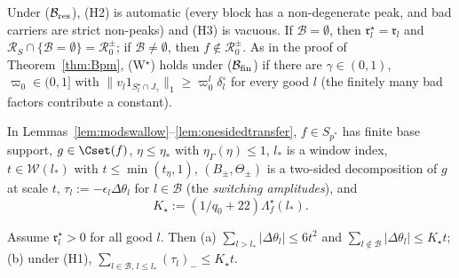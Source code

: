 Under ($\mathcal B_{\rm res}$), (H2) is automatic (every block has a
non-degenerate peak, and bad carriers are strict non-peaks) and (H3) is
vacuous.  If $\mathcal B=\emptyset$, then $\mathfrak r^\star_l=\mathfrak r_l$
and $\mathcal R_S\cap\{\mathcal B=\emptyset\}=\mathcal R_0^\pm$; if
$\mathcal B\ne\emptyset$, then $f\notin\mathcal R_0^\pm$.  As in the proof
of Theorem~\ref{thm:Bpm}, (W$^\star$) holds under ($\mathcal B_{\rm fin}$)
if there are $\gamma\in(0,1)$, $\varpi_0\in(0,1]$ with $\|v_l
1_{S^\star_l\cap J_\gamma}\|_1\ge\varpi_0^l\delta^\circ_l$ for every good
$l$ (the finitely many bad factors contribute a constant).

In Lemmas~\ref{lem:modswallow}--\ref{lem:onesidedtransfer}, $f\in S_{p^*}$
has finite base support, $g\in\Cset(f)$, $\eta\le\eta_*$ with
$\eta_\Gamma(\eta)\le1$, $l_*$ is a window index, $t\in\mathcal W(l_*)$ with
$t\le\min(t_\eta,1)$, $(B_\pm,\Theta_\pm)$ is a two-sided decomposition of
$g$ at scale $t$, $\tau_l:=-\epsilon_l\Delta\theta_l$ for $l\in\mathcal B$
(the \emph{switching amplitudes}), and
\[
 K_\star:=(1/q_0+22)\Lambda^\star_f(l_*).
\]

\begin{lemma}\label{lem:modswallow}
Assume $\mathfrak r^\star_l>0$ for all good $l$.  Then
\textup{(a)} $\sum_{l>l_*}|\Delta\theta_l|\le6t^2$ and
$\sum_{l\notin\mathcal B}|\Delta\theta_l|\le K_\star t$;
\textup{(b)} under \textup{(H1)},
$\sum_{l\in\mathcal B,\,l\le l_*}(\tau_l)_-\le K_\star t$.
\end{lemma}

